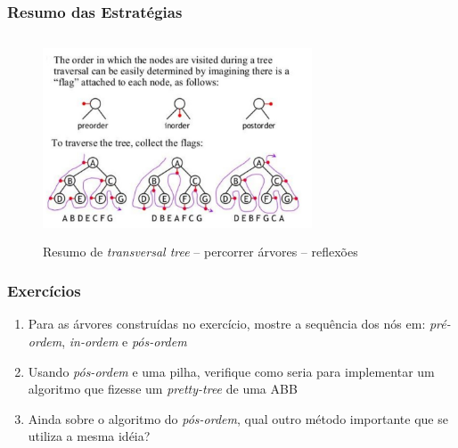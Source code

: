 \begin{frame}
  \frametitle{Resumo das Estratégias}
  
 \begin{figure}[!ht]
    \centering
    \includegraphics[width=8cm, height=6cm]{figs/fig_arvores/binary_tree_traversal.jpg}
    \caption{Resumo de \textit{transversal tree} -- percorrer árvores -- reflexões}
    \end{figure}

\end{frame}

\begin{frame}
  \frametitle{Exercícios}
  
  
  \begin{enumerate}
    \item Para as árvores construídas no exercício, mostre a sequência dos nós
    em: \textit{pré-ordem}, \textit{in-ordem} e \textit{pós-ordem}
    \pause
    
    \item Usando \textit{pós-ordem} e uma pilha, verifique como seria para implementar
    um algoritmo que fizesse um \textit{pretty-tree} de uma ABB
    \pause
    
    \item Ainda sobre o algoritmo do \textit{pós-ordem}, qual outro método
    importante que se  utiliza a mesma idéia?
    
    

  \end{enumerate}

\end{frame}







